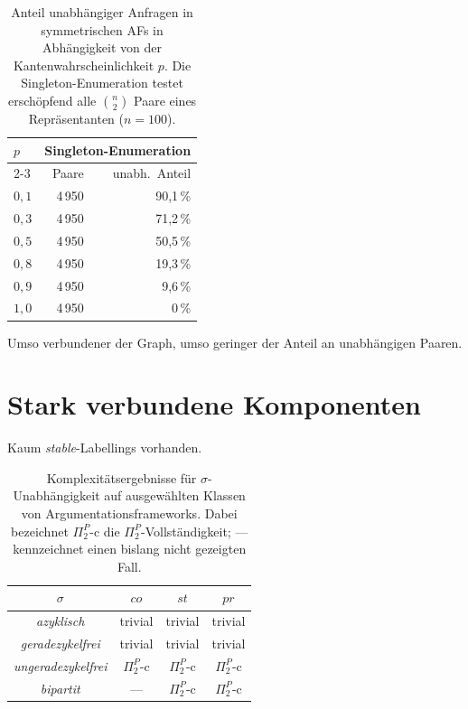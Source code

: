 \begin{table}[htbp]
    \myfloatalign
    \centering
    \begin{tabular}{l r r} \toprule
        \(p\) & \multicolumn{2}{c}{Singleton-Enumeration} \\
        \cmidrule(lr){2-3}
              & Paare & unabh.\ Anteil \\ \midrule
        \(0{,}1\) & 4\,950 & 90{,}1\,\% \\
        \(0{,}3\) & 4\,950 & 71{,}2\,\% \\
        \(0{,}5\) & 4\,950 & 50{,}5\,\% \\
        \(0{,}8\) & 4\,950 & 19{,}3\,\% \\
        \(0{,}9\) & 4\,950 & 9{,}6\,\% \\
        \(1{,}0\) & 4\,950 & 0\,\%  \\
        \bottomrule
    \end{tabular}
    \caption[Unabh\"angigkeitsrate symmetrischer AFs nach Kantenwahrscheinlichkeit]{Anteil
    unabh\"angiger Anfragen in symmetrischen AFs in Abh\"angigkeit von der
    Kantenwahrscheinlichkeit \(p\). Die Singleton-Enumeration testet
    ersch\"opfend alle \(\binom{n}{2}\) Paare eines Repr\"asentanten (\(n=100\)).}
    \label{tab:gce-sym}
\end{table}
Umso verbundener der Graph, umso geringer der Anteil an unabhängigen Paaren. 


\section{Stark verbundene Komponenten}
\label{sec:scc-afs}

Kaum \emph{stable}-Labellings vorhanden. 

\begin{table}[htbp]
    \centering
    \renewcommand{\arraystretch}{1.15}
    \setlength{\tabcolsep}{1.2em}
    \begin{tabular}{c|ccc}
        \(\sigma\) 
        & \(co\) 
        & \(st\) 
        & \(pr\) \\
        \hline
        \emph{azyklisch}
        & trivial
        & trivial
        & trivial \\
        \emph{geradezykelfrei}
        & trivial
        & trivial
        & trivial \\
        \emph{ungeradezykelfrei}
        & \(\Pi_2^P\)-c
        & \(\Pi_2^P\)-c
        & \(\Pi_2^P\)-c \\
        \emph{bipartit}
        & ---
        & \(\Pi_2^P\)-c
        & \(\Pi_2^P\)-c
    \end{tabular}
    \caption{Komplexitätsergebnisse für \(\sigma\)-Unabhängigkeit auf ausgewählten
    Klassen von Argumentationsframeworks. Dabei bezeichnet
    \(\Pi_2^P\text{-c}\) die \(\Pi_2^P\)-Vollständigkeit; --- kennzeichnet einen
    bislang nicht gezeigten Fall.}
    \label{tab:complexity-results-graph-classes}
\end{table}